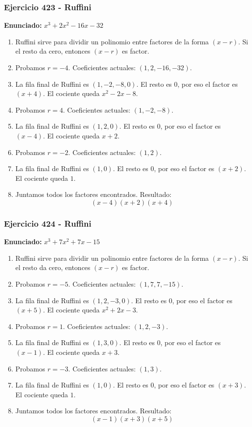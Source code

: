 \documentclass[11pt,a4paper]{article}
\begin{document}
\vspace{0.2cm}
\subsubsection*{Ejercicio 423 - Ruffini}
\textbf{Enunciado:} $ x^{3} + 2 x^{2} - 16 x - 32 $\par
\begin{enumerate}[leftmargin=2em]
\item Ruffini sirve para dividir un polinomio entre factores de la forma \((x-r)\). Si el resto da cero, entonces \((x-r)\) es factor.
\item Probamos \(r=-4\). Coeficientes actuales: \((1, 2, -16, -32)\).
\item La fila final de Ruffini es \((1, -2, -8, 0)\). El resto es \(0\), por eso el factor es \((x+4)\). El cociente queda \(x^{2} - 2 x - 8\).
\item Probamos \(r=4\). Coeficientes actuales: \((1, -2, -8)\).
\item La fila final de Ruffini es \((1, 2, 0)\). El resto es \(0\), por eso el factor es \((x-4)\). El cociente queda \(x + 2\).
\item Probamos \(r=-2\). Coeficientes actuales: \((1, 2)\).
\item La fila final de Ruffini es \((1, 0)\). El resto es \(0\), por eso el factor es \((x+2)\). El cociente queda \(1\).
\item Juntamos todos los factores encontrados. Resultado: \[\boxed{\left(x - 4\right) \left(x + 2\right) \left(x + 4\right)}\]
\end{enumerate}

\vspace{0.2cm}
\subsubsection*{Ejercicio 424 - Ruffini}
\textbf{Enunciado:} $ x^{3} + 7 x^{2} + 7 x - 15 $\par
\begin{enumerate}[leftmargin=2em]
\item Ruffini sirve para dividir un polinomio entre factores de la forma \((x-r)\). Si el resto da cero, entonces \((x-r)\) es factor.
\item Probamos \(r=-5\). Coeficientes actuales: \((1, 7, 7, -15)\).
\item La fila final de Ruffini es \((1, 2, -3, 0)\). El resto es \(0\), por eso el factor es \((x+5)\). El cociente queda \(x^{2} + 2 x - 3\).
\item Probamos \(r=1\). Coeficientes actuales: \((1, 2, -3)\).
\item La fila final de Ruffini es \((1, 3, 0)\). El resto es \(0\), por eso el factor es \((x-1)\). El cociente queda \(x + 3\).
\item Probamos \(r=-3\). Coeficientes actuales: \((1, 3)\).
\item La fila final de Ruffini es \((1, 0)\). El resto es \(0\), por eso el factor es \((x+3)\). El cociente queda \(1\).
\item Juntamos todos los factores encontrados. Resultado: \[\boxed{\left(x - 1\right) \left(x + 3\right) \left(x + 5\right)}\]
\end{enumerate}
\end{document}
